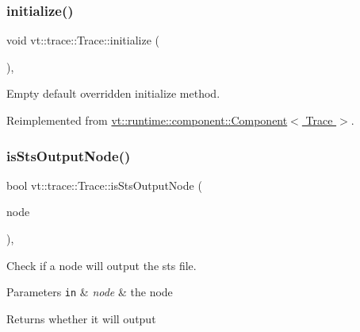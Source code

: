 \subsubsection{\texorpdfstring{initialize()}{initialize()}}
{\footnotesize\ttfamily void vt\+::trace\+::\+Trace\+::initialize (\begin{DoxyParamCaption}{ }\end{DoxyParamCaption})\hspace{0.3cm}{\ttfamily [override]}, {\ttfamily [virtual]}}



Empty default overridden initialize method. 



Reimplemented from \hyperlink{structvt_1_1runtime_1_1component_1_1_component_a7f07384d294e59796add9ce6be2d6410}{vt\+::runtime\+::component\+::\+Component$<$ Trace $>$}.

\mbox{\label{structvt_1_1trace_1_1_trace_a6d72cba8cfa150f7c97e99b9d65a1cf7}} 
\subsubsection{\texorpdfstring{is\+Sts\+Output\+Node()}{isStsOutputNode()}}
{\footnotesize\ttfamily bool vt\+::trace\+::\+Trace\+::is\+Sts\+Output\+Node (\begin{DoxyParamCaption}\item[{\hyperlink{namespacevt_a866da9d0efc19c0a1ce79e9e492f47e2}{Node\+Type}}]{node }\end{DoxyParamCaption})\hspace{0.3cm}{\ttfamily [static]}, {\ttfamily [private]}}



Check if a node will output the sts file. 


\begin{DoxyParams}[1]{Parameters}
\mbox{\tt in}  & {\em node} & the node\\
\hline
\end{DoxyParams}
\begin{DoxyReturn}{Returns}
whether it will output 
\end{DoxyReturn}
\mbox{\label{structvt_1_1trace_1_1_trace_a06f74f8d2c0c2fb97be14a264fd36a45}} 
